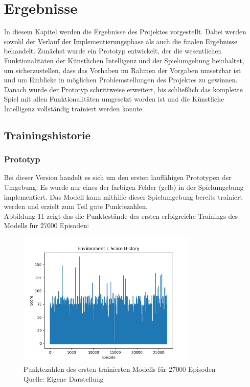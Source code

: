 \section{Ergebnisse}
In diesem Kapitel werden die Ergebnisse des Projektes vorgestellt. Dabei werden sowohl der Verlauf der Implementierungsphase als auch die finalen Ergebnisse behandelt. Zunächst wurde ein Prototyp entwickelt, der die wesentlichen Funktionalitäten der Künstlichen Intelligenz und der Spielumgebung beinhaltet, um sicherzustellen, dass das Vorhaben im Rahmen der Vorgaben umsetzbar ist und um Einblicke in möglichen Problemstellungen des Projektes zu gewinnen. Danach wurde der Prototyp schrittweise erweitert, bis schließlich das komplette Spiel mit allen Funktionalitäten umgesetzt worden ist und die Künstliche Intelligenz vollständig trainiert werden konnte.
\subsection{Trainingshistorie}
\subsubsection{Prototyp}
Bei dieser Version handelt es sich um den ersten lauffähigen Prototypen der Umgebung. Es wurde nur eines der farbigen Felder (gelb) in der Spielumgebung implementiert. Das Modell kann mithilfe dieser Spielumgebung bereits trainiert werden und erzielt zum Teil gute Punktezahlen.\\

Abbildung 11 zeigt das die Punktestände des ersten erfolgreiche Trainings des Modells für 27000 Episoden:
\nopagebreak
\begin{figure}[H]
	\centering
	\includegraphics[width=0.8\textwidth]{Bilder/firstpropertraining} 
	\caption[Punktezahlen des ersten trainierten Modells für 27000 Episoden]{Punktezahlen des ersten trainierten Modells für 27000 Episoden\\ Quelle: Eigene Darstellung}
\end{figure}

